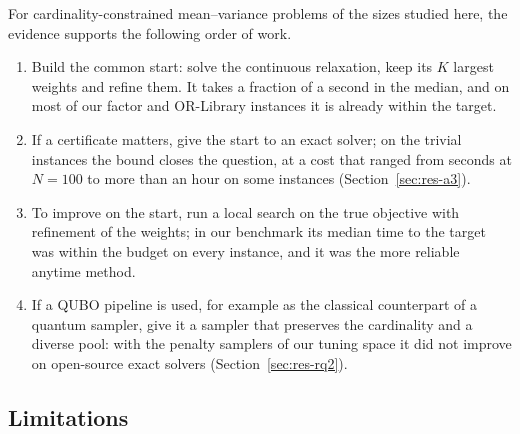 For cardinality-constrained mean--variance problems of the sizes studied here, the evidence supports the following
order of work.
\begin{enumerate}
\item Build the common start: solve the continuous relaxation, keep its $K$ largest weights and refine them. It takes a
fraction of a second in the median, and on most of our factor and OR-Library instances it is already within the
target.
\item If a certificate matters, give the start to an exact solver; on the trivial instances the bound closes the
question, at a cost that ranged from seconds at $N = 100$ to more than an hour on some instances
(Section~\ref{sec:res-a3}).
\item To improve on the start, run a local search on the true objective with refinement of the weights; in our
benchmark its median time to the target was within the budget on every instance, and it was the more reliable anytime
method.
\item If a QUBO pipeline is used, for example as the classical counterpart of a quantum sampler, give it a sampler that
preserves the cardinality and a diverse pool: with the penalty samplers of our tuning space it did not improve on
open-source exact solvers (Section~\ref{sec:res-rq2}).
\end{enumerate}

\subsection{Limitations}\label{sec:disc-limits}

